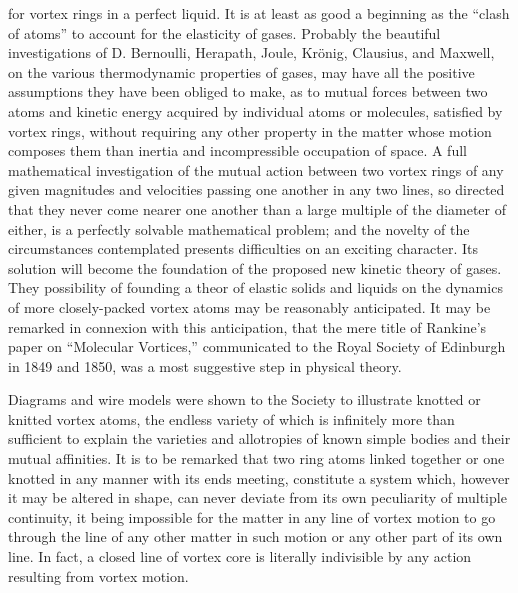 for vortex rings in a perfect liquid. It is at least as good a beginning as the
``clash of atoms'' to account for the elasticity of gases. Probably the
beautiful investigations of D. Bernoulli, Herapath, Joule, Kr\"onig, Clausius,
and Maxwell, on the various thermodynamic properties of gases, may have all the
positive assumptions they have been obliged to make, as to mutual forces
between two atoms and kinetic energy acquired by individual atoms or molecules,
satisfied by vortex rings, without requiring any other property in the matter
whose motion composes them than inertia and incompressible occupation of space.
A full mathematical investigation of the mutual action between two vortex rings
of any given magnitudes and velocities passing one another in any two lines, so
directed that they never come nearer one another than a large multiple of the
diameter of either, is a perfectly solvable mathematical problem; and the
novelty of the circumstances contemplated presents difficulties on an exciting
character. Its solution will become the foundation of the proposed new kinetic
theory of gases. They possibility of founding a theor of elastic solids and
liquids on the dynamics of more closely-packed vortex atoms may be reasonably
anticipated. It may be remarked in connexion with this anticipation, that the
mere title of Rankine's paper on ``Molecular Vortices,'' communicated to the
Royal Society of Edinburgh in 1849 and 1850, was a most suggestive step in
physical theory.

Diagrams and wire models were shown to the Society to illustrate knotted or
knitted vortex atoms, the endless variety of which is infinitely more than
sufficient to explain the varieties and allotropies of known simple bodies and
their mutual affinities. It is to be remarked that two ring atoms linked
together or one knotted in any manner with its ends meeting, constitute a
system which, however it may be altered in shape, can never deviate from its
own peculiarity of multiple continuity, it being impossible for the matter in
any line of vortex motion to go through the line of any other matter in such
motion or any other part of its own line. In fact, a closed line of vortex core
is literally indivisible by any action resulting from vortex motion.

